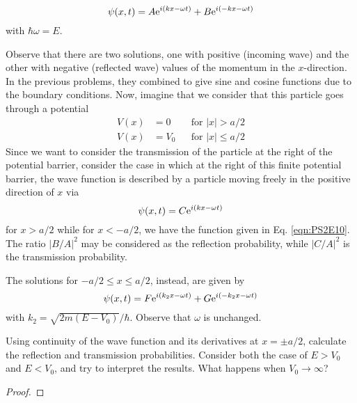 \documentclass[../psets.tex]{subfiles}
\begin{document}
\begin{enumerate}
    \begin{equation}\label{eqn:PS2E10}
        \psi(x,t) = A\e[i(kx-\omega t)]+B\e[i(-kx-\omega t)]
    \end{equation}
    with $\hbar\omega=E$.\par
    Observe that there are two solutions, one with positive (incoming wave) and the other with negative (reflected wave) values of the momentum in the $x$-direction. In the previous problems, they combined to give sine and cosine functions due to the boundary conditions. Now, imagine that we consider that this particle goes through a potential
    \begin{equation}
        \begin{aligned}
            V(x) &= 0   && \text{for }|x|>a/2\\
            V(x) &= V_0 && \text{for }|x|\leq a/2
        \end{aligned}
    \end{equation}
    Since we want to consider the transmission of the particle at the right of the potential barrier, consider the case in which at the right of this finite potential barrier, the wave function is described by a particle moving freely in the positive direction of $x$ via
    \begin{equation}
        \psi(x,t) = C\e[i(kx-\omega t)]
    \end{equation}
    for $x>a/2$ while for $x<-a/2$, we have the function given in Eq. \ref{eqn:PS2E10}. The ratio $|B/A|^2$ may be considered as the reflection probability, while $|C/A|^2$ is the transmission probability.\par
    The solutions for $-a/2\leq x\leq a/2$, instead, are given by
    \begin{equation}
        \psi(x,t) = F\e[i(k_2x-\omega t)]+G\e[i(-k_2x-\omega t)]
    \end{equation}
    with $k_2=\sqrt{2m(E-V_0)}/\hbar$. Observe that $\omega$ is unchanged.\par
    Using continuity of the wave function and its derivatives at $x=\pm a/2$, calculate the reflection and transmission probabilities. Consider both the case of $E>V_0$ and $E<V_0$, and try to interpret the results. What happens when $V_0\to\infty$?
    \begin{proof}




\end{proof}
\end{enumerate}
\end{document}
